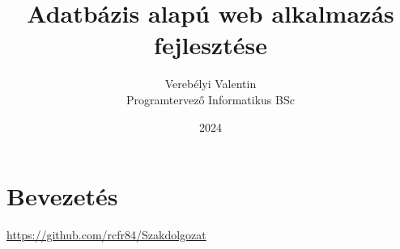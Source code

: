 \documentclass[]{thesis-ekf}
\theoremstyle{definition}
\theoremstyle{remark}
\begin{document}
	\title{Adatbázis alapú web alkalmazás fejlesztése}
	\author{Verebélyi Valentin\\Programtervező Informatikus BSc}
	\date{2024}
	\maketitle
	\tableofcontents
	
	\chapter*{Bevezetés}
	\begin{center}
		\url{https://github.com/rcfr84/Szakdolgozat}
	\end{center}
\end{document}
